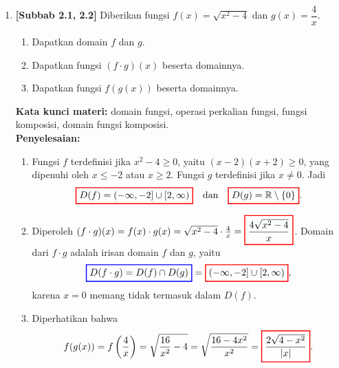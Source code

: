 \documentclass[10pt,openany,a4paper]{article}
\theoremstyle{definition}
\theoremstyle{definition}
\theoremstyle{plain}
\newenvironment{jawab}[2][tes]{%
\par\noindent\textbf{Kata kunci materi:} #1.\\
\textbf{Penyelesaian:} #2%
}{}
\begin{document}
\begin{enumerate}
    \item \textbf{[Subbab 2.1, 2.2]} Diberikan fungsi $f(x)=\sqrt{x^2-4}$ dan $g(x)=\dfrac{4}{x}$.
    \begin{enumerate}
        \item Dapatkan domain $f$ dan $g$.
        \item Dapatkan fungsi $(f\cdot g)(x)$ beserta domainnya.
        \item Dapatkan fungsi $f(g(x))$ beserta domainnya.
    \end{enumerate}
    \begin{jawab}[domain fungsi, operasi perkalian fungsi, fungsi komposisi, domain fungsi komposisi]{
        \begin{enumerate}
            \item Fungsi $f$ terdefinisi jika $x^2-4\geq 0$, yaitu $(x-2)(x+2)\geq 0$, yang dipenuhi oleh $x\leq -2$ atau $x\geq 2$. Fungsi $g$ terdefinisi jika $x\neq 0$. Jadi
            \begin{align*}
                \colorlet{oldcolor}{.}
        \color{red}
        \setlength{\fboxrule}{1pt} \boxed{\color{oldcolor}D(f)=(-\infty,-2]\cup[2,\infty)}\color{oldcolor} \quad\text{dan}\quad \colorlet{oldcolor}{.}
        \color{red}
        \setlength{\fboxrule}{1pt} \boxed{\color{oldcolor}D(g)=\mathbb{R}\setminus\{0\}}\color{oldcolor}.
            \end{align*}
            \item Diperoleh $(f\cdot g)(x)=f(x)\cdot g(x)=\sqrt{x^2-4}\cdot\frac{4}{x}=\colorlet{oldcolor}{.}
        \color{red}
        \setlength{\fboxrule}{1pt} \boxed{\color{oldcolor}\frac{4\sqrt{x^2-4}}{x}}\color{oldcolor}$. Domain dari $f\cdot g$ adalah irisan domain $f$ dan $g$, yaitu
            \begin{align*}
                \colorlet{oldcolor}{.}
        \color{blue}
        \setlength{\fboxrule}{1pt} \boxed{\color{oldcolor}D(f\cdot g)=D(f)\cap D(g)}\color{oldcolor} = \colorlet{oldcolor}{.}
        \color{red}
        \setlength{\fboxrule}{1pt} \boxed{\color{oldcolor}(-\infty,-2]\cup[2,\infty)}\color{oldcolor},
            \end{align*}
            karena $x=0$ memang tidak termasuk dalam $D(f)$.
            \item Diperhatikan bahwa
            \begin{align*}
                f(g(x)) = f\left(\frac{4}{x}\right) = \sqrt{\frac{16}{x^2}-4} = \sqrt{\frac{16-4x^2}{x^2}} = \colorlet{oldcolor}{.}
        \color{red}
        \setlength{\fboxrule}{1pt} \boxed{\color{oldcolor}\frac{2\sqrt{4-x^2}}{|x|}}\color{oldcolor}.

\end{align*}
\end{enumerate}}
\end{jawab}
\end{enumerate}
\end{document}
